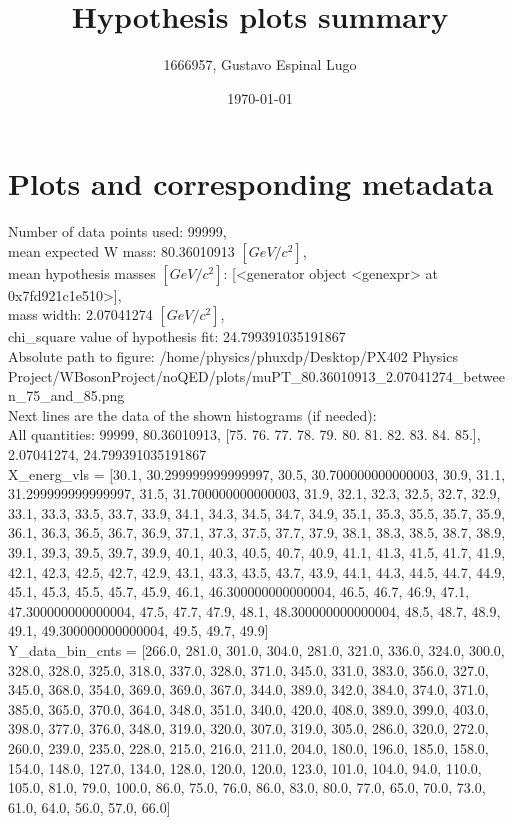 \documentclass[12pt]{article}
\begin{document}
	\title{Hypothesis plots summary} %
	\author{1666957, Gustavo Espinal Lugo}
	\date{\today} %

	\maketitle
	
	\section*{Plots and corresponding metadata}
	Number of data points used: 99999,\\
mean expected W mass: 80.36010913 $[GeV/c^{2}]$,\\
mean hypothesis masses $[GeV/c^{2}]$: [<generator object <genexpr> at 0x7fd921c1e510>],\\
mass width: 2.07041274 $[GeV/c^{2}]$,\\
chi\_square value of hypothesis fit: 24.799391035191867\\
	Absolute path to figure: /home/physics/phuxdp/Desktop/PX402 Physics Project/WBosonProject/noQED/plots/muPT\_80.36010913\_2.07041274\_between\_75\_and\_85.png\\
	Next lines are the data of the shown histograms (if needed): \\
	All quantities: 	99999, 80.36010913, [75. 76. 77. 78. 79. 80. 81. 82. 83. 84. 85.], 2.07041274, 24.799391035191867\\
	X\_energ\_vls = [30.1, 30.299999999999997, 30.5, 30.700000000000003, 30.9, 31.1, 31.299999999999997, 31.5, 31.700000000000003, 31.9, 32.1, 32.3, 32.5, 32.7, 32.9, 33.1, 33.3, 33.5, 33.7, 33.9, 34.1, 34.3, 34.5, 34.7, 34.9, 35.1, 35.3, 35.5, 35.7, 35.9, 36.1, 36.3, 36.5, 36.7, 36.9, 37.1, 37.3, 37.5, 37.7, 37.9, 38.1, 38.3, 38.5, 38.7, 38.9, 39.1, 39.3, 39.5, 39.7, 39.9, 40.1, 40.3, 40.5, 40.7, 40.9, 41.1, 41.3, 41.5, 41.7, 41.9, 42.1, 42.3, 42.5, 42.7, 42.9, 43.1, 43.3, 43.5, 43.7, 43.9, 44.1, 44.3, 44.5, 44.7, 44.9, 45.1, 45.3, 45.5, 45.7, 45.9, 46.1, 46.300000000000004, 46.5, 46.7, 46.9, 47.1, 47.300000000000004, 47.5, 47.7, 47.9, 48.1, 48.300000000000004, 48.5, 48.7, 48.9, 49.1, 49.300000000000004, 49.5, 49.7, 49.9]\\
	Y\_data\_bin\_cnts = [266.0, 281.0, 301.0, 304.0, 281.0, 321.0, 336.0, 324.0, 300.0, 328.0, 328.0, 325.0, 318.0, 337.0, 328.0, 371.0, 345.0, 331.0, 383.0, 356.0, 327.0, 345.0, 368.0, 354.0, 369.0, 369.0, 367.0, 344.0, 389.0, 342.0, 384.0, 374.0, 371.0, 385.0, 365.0, 370.0, 364.0, 348.0, 351.0, 340.0, 420.0, 408.0, 389.0, 399.0, 403.0, 398.0, 377.0, 376.0, 348.0, 319.0, 320.0, 307.0, 319.0, 305.0, 286.0, 320.0, 272.0, 260.0, 239.0, 235.0, 228.0, 215.0, 216.0, 211.0, 204.0, 180.0, 196.0, 185.0, 158.0, 154.0, 148.0, 127.0, 134.0, 128.0, 120.0, 120.0, 123.0, 101.0, 104.0, 94.0, 110.0, 105.0, 81.0, 79.0, 100.0, 86.0, 75.0, 76.0, 86.0, 83.0, 80.0, 77.0, 65.0, 70.0, 73.0, 61.0, 64.0, 56.0, 57.0, 66.0]\\
\end{document}
